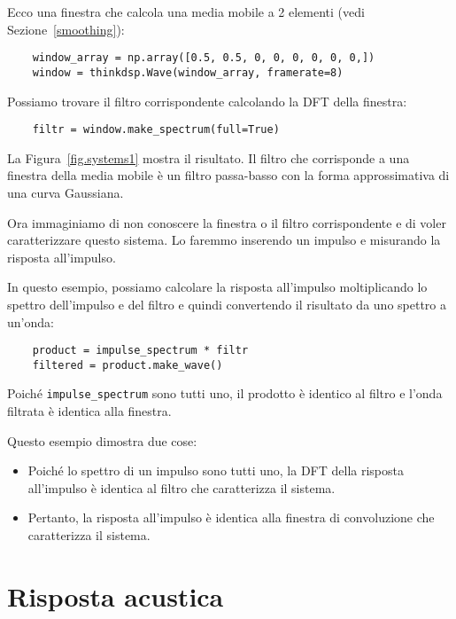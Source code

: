 \documentclass[12pt,a4paper]{book}
\begin{document}
Ecco una finestra che calcola una media mobile a 2 elementi (vedi Sezione~\ref{smoothing}):

\begin{verbatim} 
    window_array = np.array([0.5, 0.5, 0, 0, 0, 0, 0, 0,])
    window = thinkdsp.Wave(window_array, framerate=8)
 \end{verbatim} 

Possiamo trovare il filtro corrispondente calcolando la DFT della finestra:

\begin{verbatim} 
    filtr = window.make_spectrum(full=True)
 \end{verbatim} 

La Figura~\ref{fig.systems1} mostra il risultato. Il filtro che corrisponde a una finestra della media mobile è un filtro passa-basso con la forma approssimativa di una curva Gaussiana.

Ora immaginiamo di non conoscere la finestra o il filtro corrispondente e di voler caratterizzare questo sistema. Lo faremmo inserendo un impulso e misurando la risposta all'impulso.

In questo esempio, possiamo calcolare la risposta all'impulso moltiplicando lo spettro dell'impulso e del filtro e quindi convertendo il risultato da uno spettro a un'onda:

\begin{verbatim} 
    product = impulse_spectrum * filtr
    filtered = product.make_wave()
 \end{verbatim} 

Poiché \verb"impulse_spectrum" sono tutti uno, il prodotto è identico al filtro e l'onda filtrata è identica alla finestra.

Questo esempio dimostra due cose:

\begin{itemize} 

\item Poiché lo spettro di un impulso sono tutti uno, la DFT della risposta all'impulso è identica al filtro che caratterizza il sistema.

\item Pertanto, la risposta all'impulso è identica alla finestra di convoluzione che caratterizza il sistema.

\end{itemize} 

\section{Risposta acustica} \label{response} 
\end{document}
